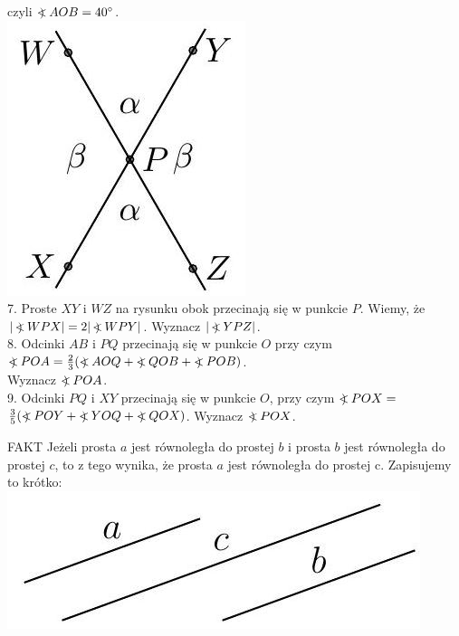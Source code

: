 \documentclass[10pt]{article}
\newcommand\Varangle{\mathop{{<\!\!\!\!\!\text{\small)}}\:}\nolimits}
\begin{document}
czyli \(\Varangle A O B=40^{\circ}\).\\
\includegraphics[max width=\textwidth, center]{2024_11_21_8f01584889ff06348ae7g-189}\\
7. Proste \(X Y\) i \(W Z\) na rysunku obok przecinają się w punkcie \(P\). Wiemy, że \(|\Varangle W P X|=2|\Varangle W P Y|\). Wyznacz \(|\Varangle Y P Z|\).\\
8. Odcinki \(A B\) i \(P Q\) przecinają się w punkcie \(O\) przy czym \(\Varangle P O A=\frac{2}{3}(\Varangle A O Q+\Varangle Q O B+\Varangle P O B)\).\\
Wyznacz \(\Varangle P O A\).\\
9. Odcinki \(P Q\) i \(X Y\) przecinają się w punkcie \(O\), przy czym \(\Varangle P O X=\) \(\frac{3}{5}(\Varangle P O Y+\Varangle Y O Q+\Varangle Q O X)\). Wyznacz \(\Varangle P O X\).

FAKT Jeżeli prosta \(a\) jest równoległa do prostej \(b\) i prosta \(b\) jest równoległa do prostej \(c\), to z tego wynika, że prosta \(a\) jest równoległa do prostej c. Zapisujemy to krótko:\\
\includegraphics[max width=\textwidth, center]{2024_11_21_8f01584889ff06348ae7g-189(1)}
\end{document}

